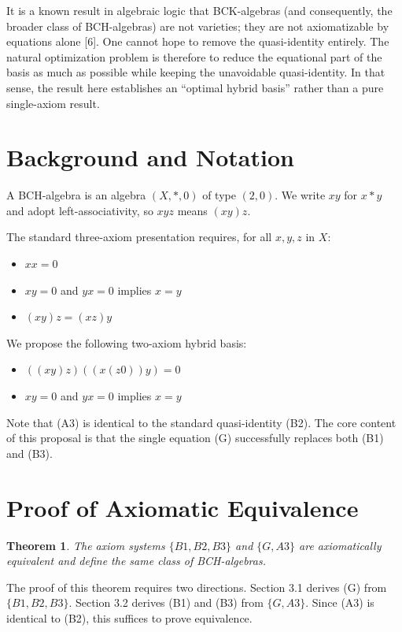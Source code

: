 \documentclass[11pt, a4paper]{article}
\newtheorem{theorem}{Theorem}
\begin{document}
It is a known result in algebraic logic that BCK-algebras (and consequently, the broader class of BCH-algebras) are not varieties; they are not axiomatizable by equations alone [6]. One cannot hope to remove the quasi-identity entirely. The natural optimization problem is therefore to reduce the equational part of the basis as much as possible while keeping the unavoidable quasi-identity. In that sense, the result here establishes an ``optimal hybrid basis'' rather than a pure single-axiom result.

\section{Background and Notation}
A BCH-algebra is an algebra $(X, \ast, 0)$ of type $(2, 0)$. We write $xy$ for $x \ast y$ and adopt left-associativity, so $xyz$ means $(xy)z$.

The standard three-axiom presentation requires, for all $x, y, z$ in $X$:
\begin{itemize}
    \item[\textbf{(B1)}] $xx = 0$
    \item[\textbf{(B2)}] $xy = 0$ and $yx = 0$ implies $x = y$
    \item[\textbf{(B3)}] $(xy)z = (xz)y$
\end{itemize}

We propose the following two-axiom hybrid basis:
\begin{itemize}
    \item[\textbf{(G)}] $((xy)z)((x(z0))y) = 0$
    \item[\textbf{(A3)}] $xy = 0$ and $yx = 0$ implies $x = y$
\end{itemize}

Note that (A3) is identical to the standard quasi-identity (B2). The core content of this proposal is that the single equation (G) successfully replaces both (B1) and (B3).

\section{Proof of Axiomatic Equivalence}

\begin{theorem}
The axiom systems $\{B1, B2, B3\}$ and $\{G, A3\}$ are axiomatically equivalent and define the same class of BCH-algebras.
\end{theorem}

The proof of this theorem requires two directions. Section 3.1 derives (G) from $\{B1, B2, B3\}$. Section 3.2 derives (B1) and (B3) from $\{G, A3\}$. Since (A3) is identical to (B2), this suffices to prove equivalence.
\end{document}
